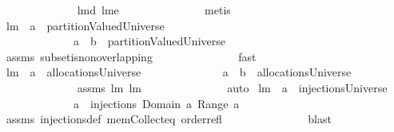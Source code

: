 \begin{isabellebody}
%
\isadelimproof
\ \ \ \ \ \ \ \ \ \ \ \ %
\endisadelimproof
%
\isatagproof
{}\isamarkupfalse%
\ lm{}{}d\ lm{}{}e\ \isanewline
\ \ \ \ \ \ \ \ \ \ \ \ \isamarkupfalse%
\ metis%
\endisatagproof
{\isafoldproof}%
%
\isadelimproof
\isanewline
%
\endisadelimproof
\isanewline
{}\isamarkupfalse%
\ lm{}{}{\isacharcolon}\ \ {\isachardoublequoteopen}a\ {\isasymin}\ partitionValuedUniverse{\isachardoublequoteclose}\ \isanewline
\ \ \ \ \ \ \ \ \ \ \ \ \ {\isachardoublequoteopen}a\ {\isacharminus}\ b\ {\isasymin}\ partitionValuedUniverse{\isachardoublequoteclose}\ \isanewline
%
\isadelimproof
\ \ \ \ \ \ \ \ \ \ \ \ %
\endisadelimproof
%
\isatagproof
{}\isamarkupfalse%
\ assms\ subset{\isacharunderscore}is{\isacharunderscore}non{\isacharunderscore}overlapping\ \isanewline
\ \ \ \ \ \ \ \ \ \ \ \ \isamarkupfalse%
\ fast%
\endisatagproof
{\isafoldproof}%
%
\isadelimproof
\isanewline
%
\endisadelimproof
\isanewline
{}\isamarkupfalse%
\ lm{}{}{\isacharcolon}\ \ {\isachardoublequoteopen}a\ {\isasymin}\ allocationsUniverse{\isachardoublequoteclose}\ \isanewline
\ \ \ \ \ \ \ \ \ \ \ \ \ {\isachardoublequoteopen}a\ {\isacharminus}\ b\ {\isasymin}\ allocationsUniverse{\isachardoublequoteclose}\ \isanewline
%
\isadelimproof
\ \ \ \ \ \ \ \ \ \ \ \ %
\endisadelimproof
%
\isatagproof
{}\isamarkupfalse%
\ assms\ lm{}{}\ lm{}{}\ \isanewline
\ \ \ \ \ \ \ \ \ \ \ \ \isamarkupfalse%
\ auto%
\endisatagproof
{\isafoldproof}%
%
\isadelimproof
\isanewline
%
\endisadelimproof
\isanewline
{}\isamarkupfalse%
\ lm{}{}{\isacharcolon}\ \ {\isachardoublequoteopen}a\ {\isasymin}\ injectionsUniverse{\isachardoublequoteclose}\ \isanewline
\ \ \ \ \ \ \ \ \ \ \ \ \ {\isachardoublequoteopen}a\ {\isasymin}\ injections\ {\isacharparenleft}Domain\ a{\isacharparenright}\ {\isacharparenleft}Range\ a{\isacharparenright}{\isachardoublequoteclose}\isanewline
%
\isadelimproof
\ \ \ \ \ \ \ \ \ \ \ \ %
\endisadelimproof
%
\isatagproof
{}\isamarkupfalse%
\ assms\ injections{\isacharunderscore}def\ mem{\isacharunderscore}Collect{\isacharunderscore}eq\ order{\isacharunderscore}refl\ \isanewline
\ \ \ \ \ \ \ \ \ \ \ \ \isamarkupfalse%
\ blast%
\endisatagproof
{\isafoldproof}%

\end{isabellebody}

